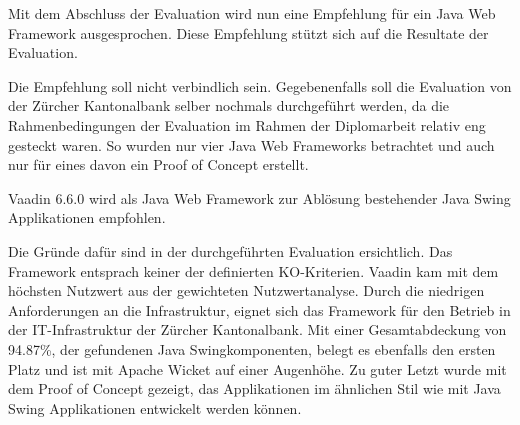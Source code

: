 Mit dem Abschluss der Evaluation wird nun eine Empfehlung für ein Java Web
Framework ausgesprochen. Diese Empfehlung stützt sich auf die Resultate der
Evaluation.

Die Empfehlung soll nicht verbindlich sein. Gegebenenfalls soll die Evaluation
von der Zürcher Kantonalbank selber nochmals durchgeführt werden, da die
Rahmenbedingungen der Evaluation im Rahmen der Diplomarbeit relativ eng gesteckt
waren. So wurden nur vier Java Web Frameworks betrachtet und auch nur für eines
davon ein Proof of Concept erstellt.
\newline

\leftskip=1.6cm
\rightskip=1.6cm
Vaadin 6.6.0 wird als Java Web Framework zur Ablösung bestehender Java Swing
Applikationen empfohlen.
\newline

\par
\begingroup
\leftskip=0cm
\rightskip=0cm
Die Gründe dafür sind in der durchgeführten Evaluation ersichtlich. Das
Framework entsprach keiner der definierten KO-Kriterien. Vaadin kam mit dem
höchsten Nutzwert aus der gewichteten Nutzwertanalyse. Durch die niedrigen
Anforderungen an die Infrastruktur, eignet sich das Framework für den Betrieb in
der IT-Infrastruktur der Zürcher Kantonalbank. Mit einer Gesamtabdeckung von
94.87\%, der gefundenen Java Swingkomponenten, belegt es ebenfalls den ersten
Platz und ist mit Apache Wicket auf einer Augenhöhe. Zu guter Letzt wurde mit
dem Proof of Concept gezeigt, das Applikationen im ähnlichen Stil wie mit Java
Swing Applikationen entwickelt werden können.
